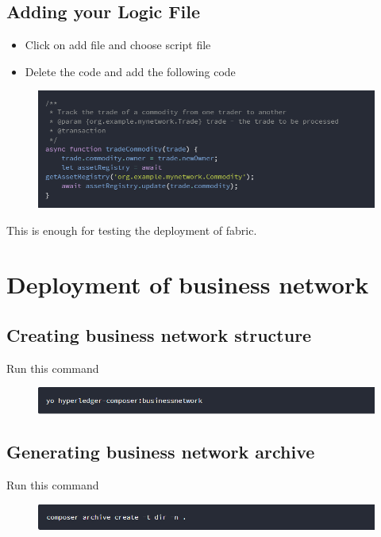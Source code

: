 \subsection{Adding your Logic File}
\begin{itemize}
	\item Click on add file and choose script file
	\item Delete the code and add the following code
\end{itemize}

\begin{figure}[h]
	\centering
	\includegraphics[width=450px]{figures/installation/11.png}
\end{figure}
This is enough for testing the deployment of fabric.
\section{Deployment of business network}
\subsection{Creating business network structure}
Run this command 
\begin{figure}[h]
	\centering
	\includegraphics[width=450px]{figures/installation/12.png}
\end{figure}

\subsection{Generating business network archive}
Run this command 
\begin{figure}[h]
	\centering
	\includegraphics[width=450px]{figures/installation/13.png}
\end{figure}

